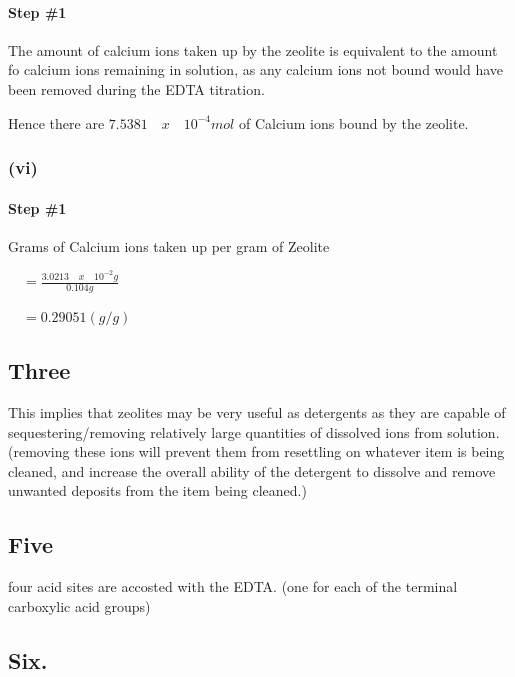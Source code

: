 \documentclass[]{article}
\let\oldparagraph\paragraph
\renewcommand{\paragraph}[1]{\oldparagraph{#1}\mbox{}}
\begin{document}
\hypertarget{step-1-6}{%
\paragraph{Step \#1}\label{step-1-6}}

The amount of calcium ions taken up by the zeolite is equivalent to the
amount fo calcium ions remaining in solution, as any calcium ions not
bound would have been removed during the EDTA titration.

Hence there are \(7.5381 \quad x \quad 10^{-4}mol\) of Calcium ions
bound by the zeolite.

\hypertarget{vi}{%
\subsubsection{(vi)}\label{vi}}

\hypertarget{step-1-7}{%
\paragraph{Step \#1}\label{step-1-7}}

Grams of Calcium ions taken up per gram of Zeolite

\(\quad = \frac{3.0213 \quad x \quad 10^{-2}g}{0.104g}\)

\(\quad = 0.29051 (g/g)\)

\hypertarget{three}{%
\subsection{Three}\label{three}}

This implies that zeolites may be very useful as detergents as they are
capable of sequestering/removing relatively large quantities of
dissolved ions from solution. (removing these ions will prevent them
from resettling on whatever item is being cleaned, and increase the
overall ability of the detergent to dissolve and remove unwanted
deposits from the item being cleaned.)

\hypertarget{five}{%
\subsection{Five}\label{five}}

four acid sites are accosted with the EDTA. (one for each of the
terminal carboxylic acid groups)

\hypertarget{six.}{%
\subsection{Six.}\label{six.}}
\end{document}

